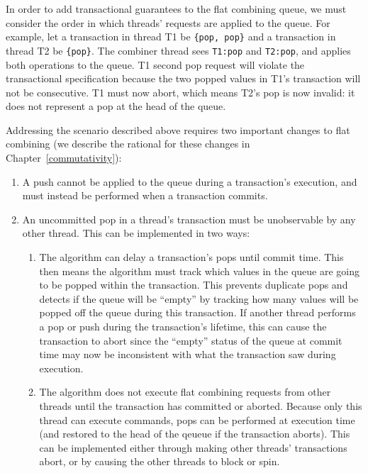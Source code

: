 In order to add transactional guarantees to the flat combining queue, we must consider the order in which threads' requests are applied to the queue. For example, let a transaction in thread T1 be \texttt{\{pop, pop\}} and a transaction in thread T2 be \texttt{\{pop\}}. The combiner thread sees \texttt{T1:pop} and \texttt{T2:pop}, and applies both operations to the queue. T1 second pop request will violate the transactional specification because the two popped values in T1's transaction will not be consecutive. T1 must now abort, which means T2's pop is now invalid: it does not represent a pop at the head of the queue.

Addressing the scenario described above requires two important changes to flat combining (we describe the rational for these changes in Chapter~\ref{commutativity}): 
\begin{enumerate}
\item A push cannot be applied to the queue during a transaction's execution, and must instead be performed when a transaction commits.
\item An uncommitted pop in a thread's transaction must be unobservable by any other thread. This can be implemented in two ways:  
    \begin{enumerate}
        \item The algorithm can delay a transaction's pops until commit time. This then means the algorithm must track which values in the queue are going to be popped within the transaction. This prevents duplicate pops and detects if the queue will be ``empty'' by tracking how many values will be popped off the queue during this transaction. If another thread performs a pop or push during the transaction's lifetime, this can cause the transaction to abort since the ``empty'' status of the queue at commit time may now be inconsistent with what the transaction saw during execution. 
        \item The algorithm does not execute flat combining requests from other threads until the transaction has committed or aborted. Because only this thread can execute commands, pops can be performed at execution time (and restored to the head of the qeueue if the transaction aborts). This can be implemented either through making other threads' transactions abort, or by causing the other threads to block or spin.
    \end{enumerate}
\end{enumerate}

